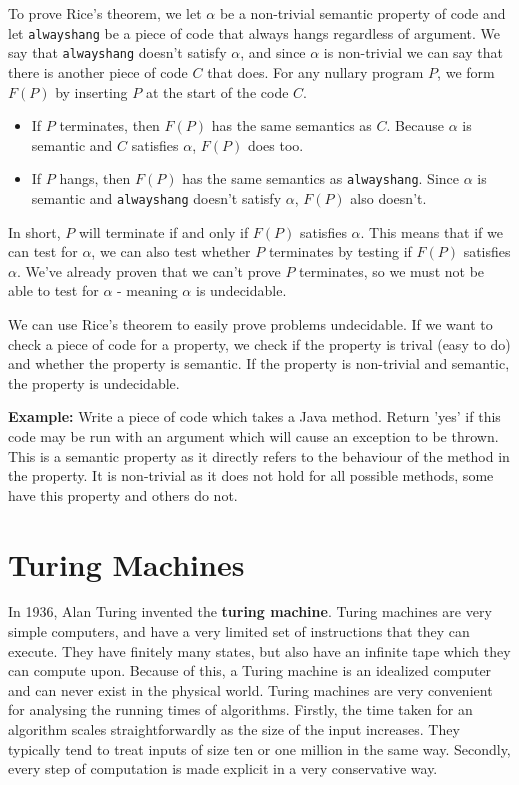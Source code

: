 \documentclass[11pt]{article}
\begin{document}
	\par 
	To prove Rice's theorem, we let $\alpha$ be a non-trivial semantic property of code and let \texttt{alwayshang} be a piece of code that always hangs regardless of argument. We say that \texttt{alwayshang} doesn't satisfy $\alpha$, and since $\alpha$ is non-trivial we can say that there is another piece of code $C$ that does. For any nullary program $P$, we form $F(P)$ by inserting $P$ at the start of the code $C$.
	\begin{itemize}
		\item If $P$ terminates, then $F(P)$ has the same semantics as $C$. Because $\alpha$ is semantic and $C$ satisfies $\alpha$, $F(P)$ does too.
		\item If $P$ hangs, then $F(P)$ has the same semantics as \texttt{alwayshang}. Since $\alpha$ is semantic and \texttt{alwayshang} doesn't satisfy $\alpha$, $F(P)$ also doesn't.
	\end{itemize}
	
	In short, $P$ will terminate if and only if $F(P)$ satisfies $\alpha$. This means that if we can test for $\alpha$, we can also test whether $P$ terminates by testing if $F(P)$ satisfies $\alpha$. We've already proven that we can't prove $P$ terminates, so we must not be able to test for $\alpha$ - meaning $\alpha$ is undecidable.
	
	\par 
	We can use Rice's theorem to easily prove problems undecidable. If we want to check a piece of code for a property, we check if the property is trival (easy to do) and whether the property is semantic. If the property is non-trivial and semantic, the property is undecidable. 
	
	\par \textbf{Example:} Write a piece of code which takes a Java method. Return 'yes' if this code may be run with an argument which will cause an exception to be thrown. This is a semantic property as it directly refers to the behaviour of the method in the property. It is non-trivial as it does not hold for all possible methods, some have this property and others do not.
	
	\section{Turing Machines}
	In 1936, Alan Turing invented the \textbf{turing machine}. Turing machines are very simple computers, and have a very limited set of instructions that they can execute. They have finitely many states, but also have an infinite tape which they can compute upon. Because of this, a Turing machine is an idealized computer and can never exist in the physical world. Turing machines are very convenient for analysing the running times of algorithms. Firstly, the time taken for an algorithm scales straightforwardly as the size of the input increases. They typically tend to treat inputs of size ten or one million in the same way. Secondly, every step of computation is made explicit in a very conservative way.
	
\end{document}
